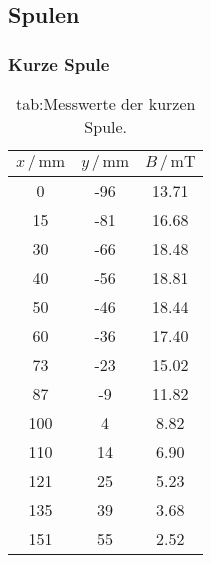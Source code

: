 \subsection{Spulen}
    \subsubsection{Kurze Spule}
    \begin{table}
    \centering
    \caption{tab:Messwerte der kurzen Spule.}
    \label{tab:kurzSp}
        \begin{tabular}{S[table-format=3.0] S[table-format=2.0] S[table-format=2.2]}
            \toprule
            {$x\,/\,\mathrm{mm}$} & {$y\,/\,\mathrm{mm}$} & {$B\,/\,\mathrm{mT}$}\\
               & -96   & 13.71 \\
            15  & -81   & 16.68 \\
            30  & -66   & 18.48 \\
            40  & -56   & 18.81 \\
            50  & -46   & 18.44 \\
            60  & -36   & 17.40 \\
            73  & -23   & 15.02 \\
            87  & -9    & 11.82 \\
            100 & 4     & 8.82  \\
            110 & 14    & 6.90  \\
            121 & 25    & 5.23  \\
            135 & 39    & 3.68  \\
            151 & 55    & 2.52  \\
            \bottomrule
        \end{tabular}
    \end{table}

